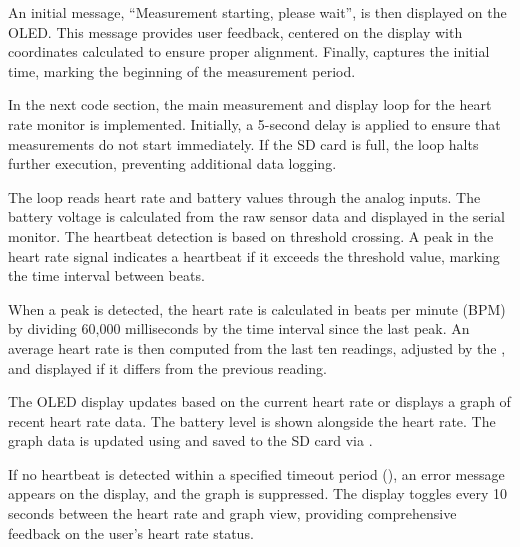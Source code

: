 An initial message, ``Measurement starting, please wait'', is then displayed on the OLED. This message provides user feedback, centered on the display with coordinates calculated to ensure proper alignment. Finally,  captures the initial time, marking the beginning of the measurement period.

{
	
	
	
}


In the next code section, the main measurement and display loop for the heart rate monitor is implemented. Initially, a 5-second delay is applied to ensure that measurements do not start immediately. If the SD card is full, the loop halts further execution, preventing additional data logging.

The loop reads heart rate and battery values through the analog inputs. The battery voltage is calculated from the raw sensor data and displayed in the serial monitor. The heartbeat detection is based on threshold crossing. A peak in the heart rate signal indicates a heartbeat if it exceeds the threshold value, marking the time interval between beats.

When a peak is detected, the heart rate is calculated in beats per minute (BPM) by dividing 60,000 milliseconds by the time interval since the last peak. An average heart rate is then computed from the last ten readings, adjusted by the , and displayed if it differs from the previous reading.

The OLED display updates based on the current heart rate or displays a graph of recent heart rate data. The battery level is shown alongside the heart rate. The graph data is updated using  and saved to the SD card via .

If no heartbeat is detected within a specified timeout period (), an error message appears on the display, and the graph is suppressed. The display toggles every 10 seconds between the heart rate and graph view, providing comprehensive feedback on the user’s heart rate status.

{
	
	
	
}


